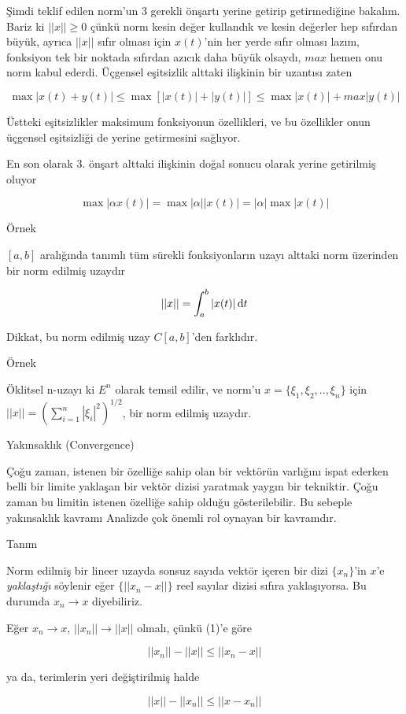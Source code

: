 \documentclass[12pt,fleqn]{article}\usepackage{../../common}
\begin{document}
Şimdi teklif edilen norm'un 3 gerekli önşartı yerine getirip getirmediğine
bakalım. Bariz ki $||x|| \ge 0$ çünkü norm kesin değer kullandık ve kesin
değerler hep sıfırdan büyük, ayrıca $||x||$ sıfır olması için $x(t)$'nin
her yerde sıfır olması lazım, fonksiyon tek bir noktada sıfırdan azıcık
daha büyük olsaydı, $max$ hemen onu norm kabul ederdi. Üçgensel eşitsizlik
alttaki ilişkinin bir uzantısı zaten

$$ 
\max |x(t) + y(t)| \le 
\max [|x(t)| + |y(t)|] \le
\max |x(t)| + max |y(t)|
$$

Üstteki eşitsizlikler maksimum fonksiyonun özellikleri, ve bu özellikler
onun üçgensel eşitsizliği de yerine getirmesini sağlıyor. 

En son olarak 3. önşart alttaki ilişkinin doğal sonucu olarak yerine
getirilmiş oluyor 

$$ \max |\alpha x(t)|  = \max |\alpha||x(t)| = |\alpha| \max |x(t)|  $$

Örnek

$[a,b]$ aralığında tanımlı tüm sürekli fonksiyonların uzayı alttaki norm
üzerinden bir norm edilmiş uzaydır

$$ ||x|| = \int _{ a}^{b} |x(t)| \,\mathrm{d} t $$

Dikkat, bu norm edilmiş uzay $C[a,b]$'den farklıdır. 

Örnek 

Öklitsel n-uzayı ki $E^n$ olarak temsil edilir, ve norm'u $x = \{ \xi_1,
\xi_2, .., \xi_n\}$ için $||x|| = (\sum _{ i=1}^{n} |\xi_i|^2)^{1/2}$, bir
norm edilmiş uzaydır.

Yakınsaklık (Convergence)

Çoğu zaman, istenen bir özelliğe sahip olan bir vektörün varlığını ispat ederken
belli bir limite yaklaşan bir vektör dizisi yaratmak yaygın bir tekniktir. Çoğu
zaman bu limitin istenen özelliğe sahip olduğu gösterilebilir. Bu sebeple
yakınsaklık kavramı Analizde çok önemli rol oynayan bir kavramdır.

Tanım 

Norm edilmiş bir lineer uzayda sonsuz sayıda vektör içeren bir dizi
$\{x_n\}$'in $x$'e {\em yaklaştığı} söylenir eğer $\{||x_n-x||\}$ reel
sayılar dizisi sıfıra yaklaşıyorsa. Bu durumda $x_n \to x$ diyebiliriz.

Eğer $x_n \to x$, $||x_n|| \to ||x||$ olmalı, çünkü (1)'e göre 

$$ ||x_n||  - ||x|| \le ||x_n-x|| $$

ya da, terimlerin yeri değiştirilmiş halde

$$ ||x||  - ||x_n|| \le ||x-x_n|| $$
\end{document}
